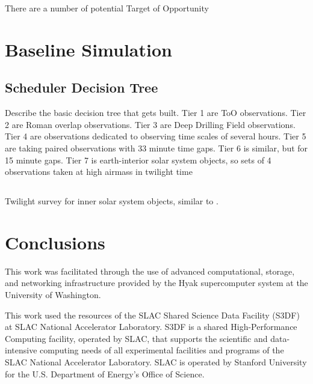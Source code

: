 \documentclass[]{aastex631}
\begin{document}
There are a number of potential Target of Opportunity 


\section{Baseline Simulation}


\subsection{Scheduler Decision Tree}
Describe the basic decision tree that gets built. Tier 1 are ToO observations. Tier 2 are Roman overlap observations. Tier 3 are Deep Drilling Field observations. Tier 4 are observations dedicated to observing time scales of several hours. Tier 5 are taking paired observations with 33 minute time gaps. Tier 6 is similar, but for 15 minute gaps. Tier 7 is earth-interior solar system objects, so sets of 4 observations taken at high airmass in twilight time 


\subsection{}




Twilight survey for inner solar system objects, similar to \citet{Ye2020}.





\section{Conclusions}


          
{}


\begin{acknowledgments}
This work was facilitated through the use of advanced computational, storage, and networking infrastructure provided by the Hyak supercomputer system at the University of Washington.

This work used the resources of the SLAC Shared Science Data Facility (S3DF) at SLAC National Accelerator Laboratory. S3DF is a shared High-Performance Computing facility, operated by SLAC, that supports the scientific and data-intensive computing needs of all experimental facilities and programs of the SLAC National Accelerator Laboratory. SLAC is operated by Stanford University for the U.S. Department of Energy’s Office of Science.
\end{acknowledgments}
\end{document}
